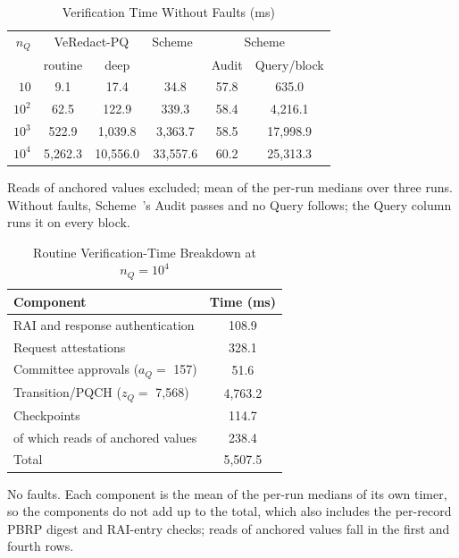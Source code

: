 \documentclass[lettersize,journal]{IEEEtran}
\begin{document}
\begin{table}[t]
\centering
\caption{Verification Time Without Faults (ms)}
\label{tab:exp4_nofault}
\scriptsize
\renewcommand{\arraystretch}{1.08}
\setlength{\tabcolsep}{3pt}
\begin{tabular}{rccccc}
\hline
$n_Q$ & \multicolumn{2}{c}{VeRedact-PQ} & Scheme~\cite{ref1} & \multicolumn{2}{c}{Scheme~\cite{ref13}} \\
 & routine & deep & & Audit & Query/block \\
\hline
$10$   & 9.1       & 17.4       & 34.8       & 57.8 & 635.0      \\
$10^2$ & 62.5      & 122.9      & 339.3      & 58.4 & 4{,}216.1  \\
$10^3$ & 522.9     & 1{,}039.8  & 3{,}363.7  & 58.5 & 17{,}998.9 \\
$10^4$ & 5{,}262.3 & 10{,}556.0 & 33{,}557.6 & 60.2 & 25{,}313.3 \\
\hline
\end{tabular}

\smallskip
\parbox{0.95\linewidth}{\tiny Reads of anchored values excluded; mean of
the per-run medians over three runs. Without faults, Scheme~\cite{ref13}'s
Audit passes and no Query follows; the Query column runs it on every
block.}
\end{table}

\begin{table}[t]
\centering
\caption{Routine Verification-Time Breakdown at $n_Q=10^4$}
\label{tab:exp4_breakdown}
\scriptsize
\renewcommand{\arraystretch}{1.08}
\setlength{\tabcolsep}{4pt}
\begin{tabular}{lc}
\hline
Component & Time (ms) \\
\hline
RAI and response authentication & 108.9 \\
Request attestations & 328.1 \\
Committee approvals ($a_Q=$ 157) & 51.6 \\
Transition/PQCH ($z_Q=$ 7{,}568) & 4{,}763.2 \\
Checkpoints & 114.7 \\
\hline
of which reads of anchored values & 238.4 \\
Total & 5{,}507.5 \\
\hline
\end{tabular}

\smallskip
\parbox{0.95\linewidth}{\tiny No faults. Each component
is the mean of the per-run medians of its own timer, so the components
do not add up to the total, which also includes the per-record PBRP
digest and RAI-entry checks; reads of anchored values fall in the first
and fourth rows.}
\end{table}
\end{document}
